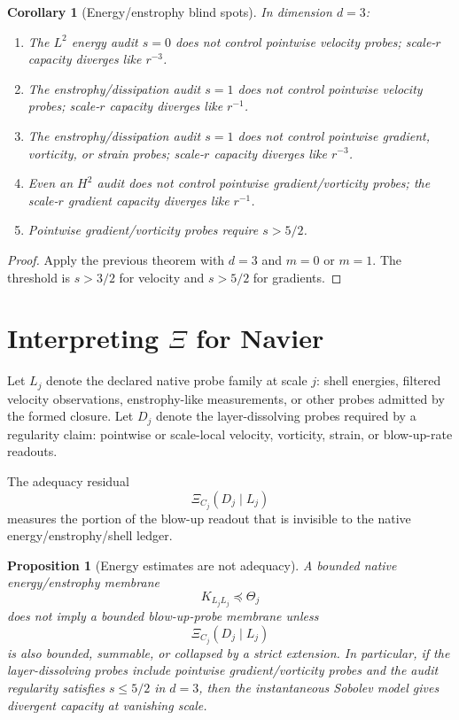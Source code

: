 \documentclass[11pt]{article}
\newtheorem{corollary}{Corollary}
\newtheorem{proposition}{Proposition}
\begin{document}
\begin{corollary}[Energy/enstrophy blind spots]
In dimension $d=3$:
\begin{enumerate}[label=(\roman*)]
\item The $L^2$ energy audit $s=0$ does not control pointwise velocity probes; scale-$r$ capacity diverges like $r^{-3}$.
\item The enstrophy/dissipation audit $s=1$ does not control pointwise velocity probes; scale-$r$ capacity diverges like $r^{-1}$.
\item The enstrophy/dissipation audit $s=1$ does not control pointwise gradient, vorticity, or strain probes; scale-$r$ capacity diverges like $r^{-3}$.
\item Even an $H^2$ audit does not control pointwise gradient/vorticity probes; the scale-$r$ gradient capacity diverges like $r^{-1}$.
\item Pointwise gradient/vorticity probes require $s>5/2$.
\end{enumerate}
\end{corollary}

\begin{proof}
Apply the previous theorem with $d=3$ and $m=0$ or $m=1$.  The threshold is $s>3/2$ for velocity and $s>5/2$ for gradients.
\end{proof}

\section{Interpreting $\Xi$ for Navier}

Let $L_j$ denote the declared native probe family at scale $j$: shell energies, filtered velocity observations, enstrophy-like measurements, or other probes admitted by the formed closure.  Let $D_j$ denote the layer-dissolving probes required by a regularity claim: pointwise or scale-local velocity, vorticity, strain, or blow-up-rate readouts.

The adequacy residual
\[
\boxed{
\Xi_{C_j}(D_j\mid L_j)
}
\]
measures the portion of the blow-up readout that is invisible to the native energy/enstrophy/shell ledger.

\begin{proposition}[Energy estimates are not adequacy]
A bounded native energy/enstrophy membrane
\[
K_{L_jL_j}\preceq\Theta_j
\]
does not imply a bounded blow-up-probe membrane unless
\[
\Xi_{C_j}(D_j\mid L_j)
\]
is also bounded, summable, or collapsed by a strict extension.  In particular, if the layer-dissolving probes include pointwise gradient/vorticity probes and the audit regularity satisfies $s\le5/2$ in $d=3$, then the instantaneous Sobolev model gives divergent capacity at vanishing scale.
\end{proposition}
\end{document}
